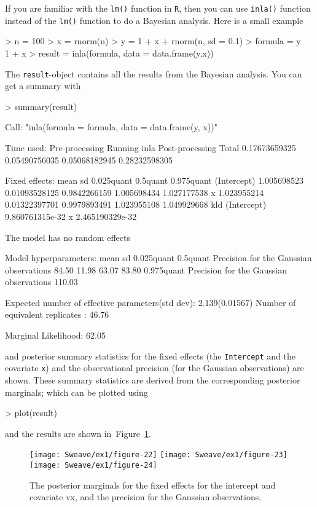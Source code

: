 \documentclass[a4paper,11pt]{report}
\newcommand{\tv}{\texttt}
\def\Fig#1{Figure~\ref{#1}}
\begin{document}
If you are familiar with the \verb|lm()| function in \tv{R}, then you
can use \verb|inla()| function instead of the \verb|lm()| function to
do a Bayesian analysis. Here is a small example
\begin{Schunk}
\begin{Sinput}
> n = 100
> x = rnorm(n)
> y = 1 + x + rnorm(n, sd = 0.1)
> formula = y ~ 1 + x
> result = inla(formula, data = data.frame(y,x))
\end{Sinput}
\end{Schunk}
The \verb|result|-object contains all the results from the Bayesian analysis.
You can get a summary with
\begin{Schunk}
\begin{Sinput}
> summary(result)
\end{Sinput}
\begin{Soutput}
Call:
"inla(formula = formula, data = data.frame(y, x))"

Time used:
 Pre-processing    Running inla Post-processing           Total 
  0.17673659325   0.05490756035   0.05068182945   0.28232598305 

Fixed effects:
                   mean            sd   0.025quant    0.5quant  0.975quant
(Intercept) 1.005698523 0.01093528125 0.9842266159 1.005698434 1.027177538
x           1.023955214 0.01322397701 0.9979893491 1.023955108 1.049929668
                        kld
(Intercept) 9.860761315e-32
x           2.465190329e-32

The model has no random effects

Model hyperparameters:
                                        mean   sd     0.025quant 0.5quant
Precision for the Gaussian observations  84.50  11.98  63.07      83.80  
                                        0.975quant
Precision for the Gaussian observations 110.03    

Expected number of effective parameters(std dev): 2.139(0.01567)
Number of equivalent replicates : 46.76 

Marginal Likelihood:  62.05 
\end{Soutput}
\end{Schunk}
and posterior summary statistics for the fixed effects (the
\tv{Intercept} and the covariate \tv{x}) and the observational
precision (for the Gaussian observations) are shown. These summary
statistics are derived from the corresponding posterior marginals;
which can be plotted using
\begin{Schunk}
\begin{Sinput}
> plot(result)
\end{Sinput}
\end{Schunk}
and the results are shown in~\Fig{fig:11}.
\begin{figure}[tbp]\centering\texttt{[image: Sweave/ex1/figure-22]}
\texttt{[image: Sweave/ex1/figure-23]}
\texttt{[image: Sweave/ex1/figure-24]}\caption{The posterior marginals for the fixed effects for the intercept and covariate 	v{x}, and the precision for the Gaussian observations.}\label{fig:11}\end{figure}
\end{document}
